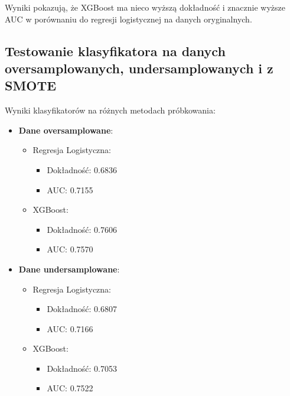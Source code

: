 \documentclass{article}
\begin{document}
Wyniki pokazują, że XGBoost ma nieco wyższą dokładność i znacznie wyższe AUC w porównaniu do regresji logistycznej na danych oryginalnych.

\subsection{Testowanie klasyfikatora na danych oversamplowanych, undersamplowanych i z SMOTE}

Wyniki klasyfikatorów na różnych metodach próbkowania:

\begin{itemize}
    \item \textbf{Dane oversamplowane}:
          \begin{itemize}
              \item Regresja Logistyczna:
                    \begin{itemize}
                        \item Dokładność: 0.6836
                        \item AUC: 0.7155
                    \end{itemize}
              \item XGBoost:
                    \begin{itemize}
                        \item Dokładność: 0.7606
                        \item AUC: 0.7570
                    \end{itemize}
          \end{itemize}
    \item \textbf{Dane undersamplowane}:
          \begin{itemize}
              \item Regresja Logistyczna:
                    \begin{itemize}
                        \item Dokładność: 0.6807
                        \item AUC: 0.7166
                    \end{itemize}
              \item XGBoost:
                    \begin{itemize}
                        \item Dokładność: 0.7053
                        \item AUC: 0.7522
                    \end{itemize}
          \end{itemize}

\end{itemize}
\end{document}
